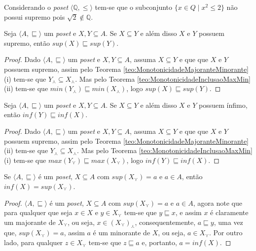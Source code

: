 \begin{example}
	Considerando o \textit{poset} $\langle \mathbb{Q}, \leq \rangle$ tem-se que o subconjunto $\{x \in Q \mid x^2 \leq 2\}$ não possui supremo pois $\sqrt{2} \notin \mathbb{Q}$.
\end{example}

\begin{theorem}
	Seja $\langle A, \sqsubseteq \rangle$ um \textit{poset} e $X, Y \subseteq A$. Se $X \subseteq Y$ e além disso $X$ e $Y$ possuem supremo, então $sup(X) \sqsubseteq sup(Y)$.
\end{theorem}

\begin{proof}
	Dado $\langle A, \sqsubseteq \rangle$ um \textit{poset} e $X, Y \subseteq A$, assuma $X \subseteq Y$ e que que $X$ e $Y$ possuem supremo, assim pelo Teorema \ref{teo:MonotonicidadeMajoranteMinorante}(i) tem-se que $Y_\curlywedge \subseteq X_\curlywedge$.  Mas pelo Teorema \ref{teo:MonotonicidadeInclusaoMaxMin}(ii) tem-se que $min(Y_\curlywedge) \sqsubseteq min(X_\curlywedge)$, logo $sup(X) \sqsubseteq sup(Y)$.
\end{proof}

\begin{theorem}
	Seja $\langle A, \sqsubseteq \rangle$ um \textit{poset} e $X, Y \subseteq A$. Se $X \subseteq Y$ e além disso $X$ e $Y$ possuem ínfimo, então $inf(Y) \sqsubseteq inf(X)$.
\end{theorem}

\begin{proof}
	Dado $\langle A, \sqsubseteq \rangle$ um \textit{poset} e $X, Y \subseteq A$, assuma $X \subseteq Y$ e que que $X$ e $Y$ possuem supremo, assim pelo Teorema \ref{teo:MonotonicidadeMajoranteMinorante}(ii) tem-se que $Y_\curlywedge \subseteq X_\curlywedge$.  Mas pelo Teorema \ref{teo:MonotonicidadeInclusaoMaxMin}(i) tem-se que $max(Y_\curlyvee) \sqsubseteq max(X_\curlyvee)$, logo $inf(Y) \sqsubseteq inf(X)$.
\end{proof}

\begin{theorem}\label{teo:InfimoApartirSupremo}
	Se $\langle A, \sqsubseteq \rangle$ é um \textit{poset}, $X \subseteq A$ com $sup(X_\curlyvee) = a$ e $a \in A$, então $inf(X) = sup(X_\curlyvee) $.
\end{theorem}

\begin{proof}
	$\langle A, \sqsubseteq \rangle$ é um \textit{poset}, $X \subseteq A$ com $sup(X_\curlyvee) = a$ e $a \in A$, agora note que para qualquer que seja $x \in X$ e $y \in X_\curlyvee$ tem-se que $y \sqsubseteq x$, e assim $x$ é claramente um majorante de $X_\curlyvee$, ou seja, $x \in (X_\curlyvee)_\curlywedge$,  consequentemente, $a \sqsubseteq y$, uma vez que, $sup(X_\curlyvee) = a$, assim $a$ é um minorante de $X$, ou seja, $a \in X_\curlyvee$. Por outro lado, para qualquer $z \in X_\curlyvee$ tem-se que $z \sqsubseteq a$ e, portanto, $a = inf(X)$.
\end{proof}

